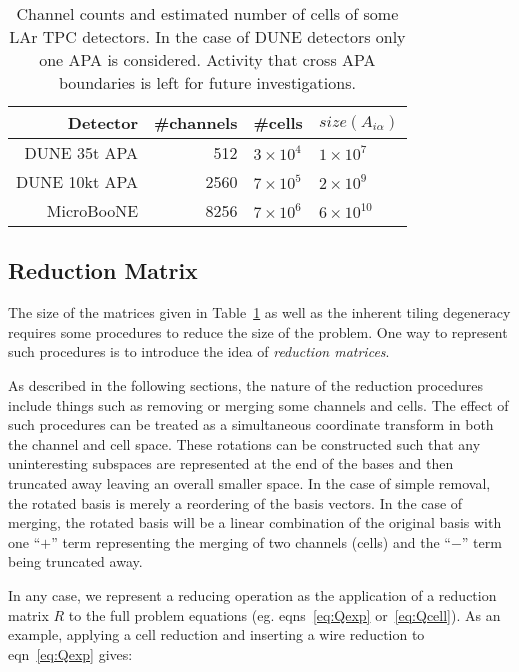 \documentclass[letter]{article}
\def\mAchc{A_{i\alpha}}
\begin{document}
\begin{table}[htbp]
  \centering
  \begin{tabular}[h]{|r|r|l|l|}
    \hline
    Detector & \#channels & \#cells & $size(\mAchc)$ \\
    \hline
    \hline
    DUNE 35t APA & 512 & $3\times 10^4$ & $1\times 10^7$\\
    DUNE 10kt APA & 2560 & $7\times 10^5$ & $2\times 10^9$ \\
    MicroBooNE & 8256 & $7\times 10^6$ & $6\times 10^{10}$\\
    \hline
  \end{tabular}
  \caption{Channel counts and estimated number of cells of some LAr
    TPC detectors.
    In the case of DUNE detectors only one APA is considered.
    Activity that cross APA boundaries is left for future investigations.}
  \label{tab:detectorcounts}
\end{table}

\subsection{Reduction Matrix}

The size of the matrices given in Table~\ref{tab:detectorcounts} as
well as the inherent tiling degeneracy requires some procedures to
reduce the size of the problem.
One way to represent such procedures is to introduce the idea of
\textit{reduction matrices}.


As described in the following sections, the nature of the reduction
procedures include things such as removing or merging some channels
and cells.
The effect of such procedures can be treated as a simultaneous
coordinate transform in both the channel and cell space.
These rotations can be constructed such that any uninteresting
subspaces are represented at the end of the bases and then truncated
away leaving an overall smaller space.
In the case of simple removal, the rotated basis is merely a
reordering of the basis vectors.
In the case of merging, the rotated basis will be a linear combination
of the original basis with one ``$+$'' term representing the merging
of two channels (cells) and the ``$-$'' term being truncated away.

In any case, we represent a reducing operation as the application of a
reduction matrix $R$ to the full problem equations (eg. eqns~\ref{eq:Qexp} or~\ref{eq:Qcell}).
As an example, applying a cell reduction and inserting a wire
reduction to eqn~\ref{eq:Qexp} gives:
\end{document}
